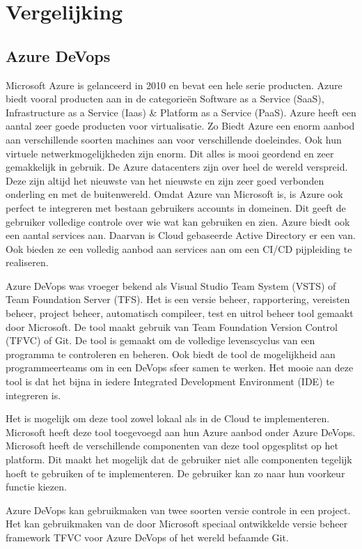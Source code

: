 \section{Vergelijking}
\subsection{Azure DeVops}
Microsoft Azure is gelanceerd in 2010 en bevat een hele serie producten. Azure biedt vooral producten aan in de categorieën Software as a Service (SaaS), Infrastructure as a Service (Iaas) \& Platform as a Service (PaaS). Azure heeft een aantal zeer goede producten voor virtualisatie. Zo Biedt Azure een enorm aanbod aan verschillende soorten machines aan voor verschillende doeleindes. Ook hun virtuele netwerkmogelijkheden zijn enorm. Dit alles is mooi geordend en zeer gemakkelijk in gebruik. De Azure datacenters zijn over heel de wereld verspreid. Deze zijn altijd het nieuwste van het nieuwste en zijn zeer goed verbonden onderling en met de buitenwereld. Omdat Azure van Microsoft is, is Azure ook perfect te integreren met bestaan gebruikers accounts in domeinen. Dit geeft de gebruiker volledige controle over wie wat kan gebruiken en zien. Azure biedt ook een aantal services aan. Daarvan is Cloud gebaseerde Active Directory er een van. Ook bieden ze een volledig aanbod aan services aan om een CI/CD pijpleiding te realiseren.

Azure DeVops was vroeger bekend als Visual Studio Team System (VSTS) of Team Foundation Server (TFS). Het is een versie beheer, rapportering, vereisten beheer, project beheer, automatisch compileer, test en uitrol beheer tool gemaakt door Microsoft. De tool maakt gebruik van Team Foundation Version Control (TFVC) of Git. De tool is gemaakt om de volledige levenscyclus van een programma te controleren en beheren. Ook biedt de tool de mogelijkheid aan programmeerteams om in een DeVops sfeer samen te werken. Het mooie aan deze tool is dat het bijna in iedere Integrated Development Environment (IDE) te integreren is.

Het is mogelijk om deze tool zowel lokaal als in de Cloud te implementeren. Microsoft heeft deze tool toegevoegd aan hun Azure aanbod onder Azure DeVops. Microsoft heeft de verschillende componenten van deze tool opgesplitst op het platform. Dit maakt het mogelijk dat de gebruiker niet alle componenten tegelijk hoeft te gebruiken of te implementeren. De gebruiker kan zo naar hun voorkeur functie kiezen.

Azure DeVops kan gebruikmaken van twee soorten versie controle in een project. Het kan gebruikmaken van de door Microsoft speciaal ontwikkelde versie beheer framework TFVC voor Azure DeVops of het wereld befaamde Git. 

